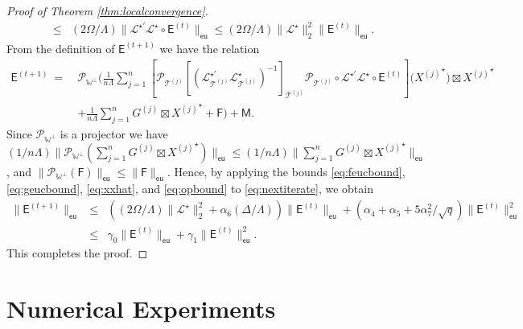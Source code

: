 \documentclass[11pt,letterpaper]{article}
\newcommand{\ct}{\mathcal{T}}
\newcommand{\cp}{\mathcal{P}}
\newcommand{\sfe}{\mathsf{E}}
\newcommand{\sff}{\mathsf{F}}
\newcommand{\sfm}{\mathsf{M}}
\newcommand{\eu}{\mathsf{eu}}
\newcommand{\roc}{\Omega}
\newcommand{\coveig}{\Lambda}
\newcommand{\covsup}{\Delta}
\begin{document}
\begin{proof}[Proof of Theorem \ref{thm:localconvergence}]
\begin{eqnarray}
		& \leq & (2\roc/\coveig) \| \mathcal{L}^{\star\prime} \mathcal{L}^{\star} \circ \sfe^{(t)} \|_{\eu}  \leq (2\roc/\coveig) \|\mathcal{L}^{\star}\|_{2}^2 \|\sfe^{(t)} \|_{\eu}.
	\end{eqnarray}	
	From the definition of $\sfe^{(t+1)}$ we have the relation
	\begin{align} \label{eq:nextiterate}
	\sfe^{(t+1)} ~ = ~ & \cp_{\mathbb{W}^{\perp}} \biggl( \frac{1}{n \coveig} \sum_{j=1}^{n} [ \cp_{\ct^{(j)}} [(\mathcal{L}^{\star\prime}_{\ct^{(j)}}\mathcal{L}^{\star}_{\ct^{(j)}})^{-1}]_{\ct^{(j)}} \cp_{\ct^{(j)}} \circ \mathcal{L}^{\star\prime} \mathcal{L}^{\star} \circ \sfe^{(t)}] \bigl({X^{(j)}}^{\star}\bigr) \boxtimes {X^{(j)}}^{\star} \nonumber \\
	& + \frac{1}{n \coveig} \sum_{j=1}^{n} G^{(j)} \boxtimes {X^{(j)}}^{\star} + \sff \biggr) + \sfm.
	\end{align}
	Since $\cp_{\mathbb{W}^{\perp}}$ is a projector we have $(1/n \coveig) \| \cp_{\mathbb{W}^{\perp}} (\sum_{j=1}^{n} G^{(j)} \boxtimes {X^{(j)}}^{\star} ) \|_{\eu} \leq (1/n \coveig) \| \sum_{j=1}^{n} G^{(j)} \boxtimes {X^{(j)}}^{\star} \|_{\eu}$, and $\|\cp_{\mathbb{W}^{\perp}}(\sff)\|_{\eu} \leq \|\sff\|_{\eu}$.  Hence, by applying the bounds \eqref{eq:feucbound}, \eqref{eq:geucbound}, \eqref{eq:xxhat}, and \eqref{eq:opbound} to \eqref{eq:nextiterate}, we obtain
	\begin{eqnarray*} 
	\|\sfe^{(t+1)}\|_{\eu} & \leq & \left( (2\roc/\coveig) \|\mathcal{L}^{\star}\|_{2}^2 + \alpha_6 (\covsup/\coveig) \right) \|\sfe^{(t)} \|_{\eu} + \left( \alpha_4+\alpha_5 + 5\alpha_7^2/\sqrt{q} \right) \|\sfe^{(t)}\|_{\eu}^2 \\
	& \leq & \gamma_0\|\sfe^{(t)}\|_{\eu} + \gamma_1\|\sfe^{(t)}\|_{\eu}^{2}.
	\end{eqnarray*}
	This completes the proof.
\end{proof}



\section{Numerical Experiments} \label{sec:numexp}

%
%
\end{document}
